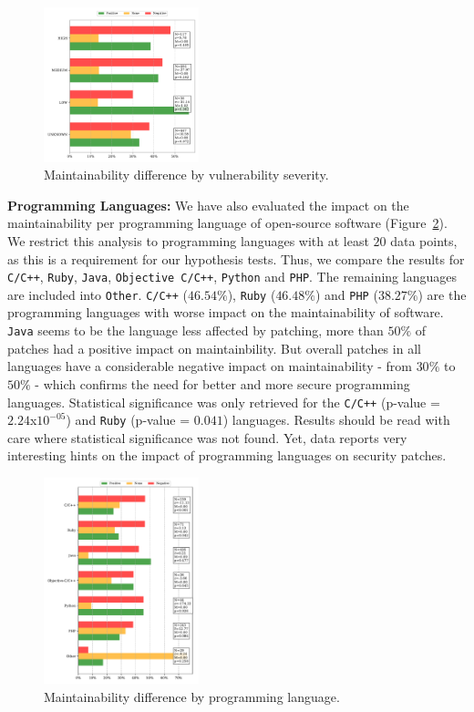 \documentclass[10pt,conference]{IEEEtran}
\begin{document}
\begin{figure}[h]
 	\centering 	\includegraphics[width=0.4\textwidth]{figures/main_per_severity.pdf}
 	\caption{Maintainability difference by vulnerability severity.}
	\label{fig:severity}
\end{figure}

\textbf{Programming Languages:} We have also evaluated the impact on the maintainability per programming 
language of open-source software (Figure~\ref{fig:lang_main}). We restrict 
this analysis to programming languages with at least $20$ data points, as this 
is a requirement for our hypothesis tests. Thus, we compare the results for 
\texttt{C/C++}, \texttt{Ruby}, \texttt{Java}, \texttt{Objective C/C++}, 
\texttt{Python} and \texttt{PHP}. The remaining languages are included into 
\texttt{Other}. \texttt{C/C++} ($46.54\%$), \texttt{Ruby} ($46.48\%$) and 
\texttt{PHP} ($38.27\%$) are the programming languages with worse 
impact on the maintainability of software. \texttt{Java} seems to be the 
language less affected by patching, more than $50\%$ of patches had a positive 
impact on maintainbility. But overall patches in all languages have a 
considerable negative impact on maintainability - from $30\%$ to $50\%$ - which 
confirms the need for better and more secure programming languages. 
Statistical significance was only retrieved for the \texttt{C/C++} 
(p-value = $2.24$x$10^{-05}$) and \texttt{Ruby} (p-value = $0.041$) languages.
Results should be read with care where statistical significance was not found.
Yet, data reports very interesting hints on the impact of programming languages 
on security patches.

\begin{figure}[h]
  \centering
  \includegraphics[width=0.4\textwidth]{figures/main_per_language.pdf}
  \caption{Maintainability difference by programming language.}
  \label{fig:lang_main}  
\end{figure}
\end{document}
